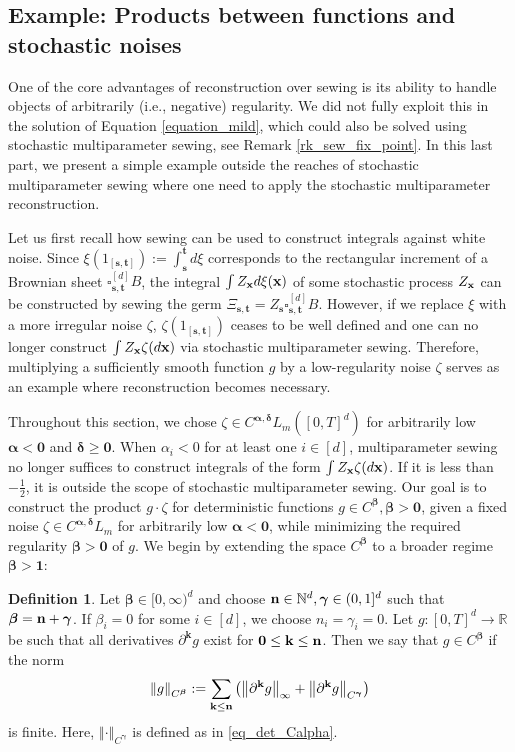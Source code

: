 \documentclass[12pt]{article}
\numberwithin{equation}{section}
\theoremstyle{plain}
\theoremstyle{definition}
\newtheorem{definition}[theorem]{Definition}
\newcommand{\norm}[1]{\left\Vert #1\right\Vert}
\def\bR{\mathbb{R}}\def\bS{\mathbb{S}}
\def\fk{\mathbf k}\def\fl{\mathbf l}
\def\fs{\mathbf s}\def\ft{\mathbf t}
\def\falpha{{\boldsymbol\alpha}}
\def\fbeta{{\boldsymbol\beta}}
\def\fgamma{{\boldsymbol\gamma}}
\def\fdelta{{\boldsymbol\delta}}
\def\foo{{\boldsymbol 0}}
\def\fone{{\boldsymbol 1}}
\begin{document}
\subsection{Example: Products between functions and stochastic noises}

One of the core advantages of reconstruction over sewing is its ability to handle objects of arbitrarily (i.e., negative) regularity. We did not fully exploit this in the solution of Equation \ref{equation_mild}, which could also be solved using stochastic multiparameter sewing, see Remark \ref{rk_sew_fix_point}.  In this last part, we present a simple example outside the reaches of stochastic multiparameter sewing where one need to apply the stochastic multiparameter reconstruction.

Let us first recall how sewing can be used to construct integrals against white noise. Since $\xi(1_{[\fs,\ft]}) := \int_{\fs}^\ft d\xi$ corresponds to the rectangular increment of a Brownian sheet $\square_{\fs,\ft}^{[d]} B$, the integral $\int Z_\mathbf x d\xi(\mathbf x)$ of some stochastic process $Z_\mathbf x$ can be constructed by sewing the germ $\Xi_{\fs,\ft} = Z_\fs \square_{\fs,\ft}^{[d]} B$. However, if we replace $\xi$ with a more irregular noise $\zeta$, $\zeta(1_{[\fs,\ft]})$ ceases to be well defined and one can no longer construct $\int Z_\mathbf x\zeta(d\mathbf x)$ via stochastic multiparameter sewing. Therefore, multiplying a sufficiently smooth function $g$ by a low-regularity noise $\zeta$ serves as an example where reconstruction becomes necessary.

Throughout this section, we chose $\zeta\in C^{\falpha,\fdelta}L_m([0,T]^d)$ for arbitrarily low $\falpha<\foo$ and $\fdelta\ge \foo$. When $\alpha_i <0$ for at least one $i\in[d]$, multiparameter sewing no longer suffices to construct integrals of the form $\int Z_\mathbf x\zeta(d\mathbf x)$. If it is less than $-\frac 12$, it is outside the scope of stochastic multiparameter sewing. Our goal is to construct the product $g\cdot\zeta$ for deterministic functions $g\in C^\fbeta,\fbeta>\foo$, given a fixed noise $\zeta\in C^{\falpha,\fdelta}L_m$ for arbitrarily low $\falpha <\foo$, while minimizing the required regularity $\fbeta>\foo$ of $g$. We begin by extending the space $C^\fbeta$ to a broader regime $\fbeta >\fone$:

\begin{definition}\label{def:Calpha}
    Let $\fbeta\in[0,\infty)^d$ and choose $\fn\in\bN^d, \fgamma\in(0,1]^d$ such that $\fbeta = \fn+\fgamma$. If $\beta_i = 0$ for some $i\in[d]$, we choose $n_i = \gamma_i= 0$. Let $g:[0,T]^d\to \bR$ be such that all derivatives $\partial^\fk g$ exist for $\foo\le\fk\le\fn$. Then we say that $g\in C^\fbeta$ if the norm
    \[
        \norm{g}_{C^\fbeta} := \sum_{\fk\le\fn} \left(\norm{\partial^\fk g}_\infty + \norm{\partial^{\fk} g}_{C^\fgamma}\right)
    \]
    is finite. Here, $\norm{\cdot}_{C^\fgamma}$ is defined as in \eqref{eq_det_Calpha}.
\end{definition}
\end{document}
